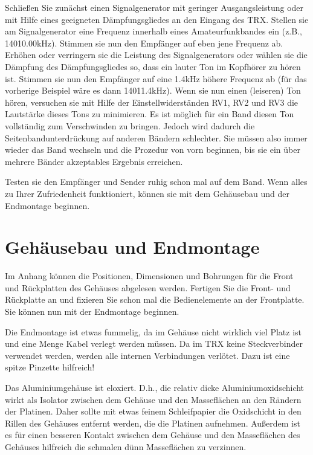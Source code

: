 \documentclass[10pt, a4paper]{paper}
\begin{document}
Schließen Sie zunächst einen Signalgenerator mit geringer Ausgangsleistung oder mit Hilfe eines geeigneten Dämpfungsgliedes an den Eingang des TRX. Stellen sie am Signalgenerator eine Frequenz innerhalb eines Amateurfunkbandes ein (z.B., 14010.00kHz). Stimmen sie nun den Empfänger auf eben jene Frequenz ab. Erhöhen oder verringern sie die Leistung des Signalgenerators oder wählen sie die Dämpfung des Dämpfungsgliedes so, dass ein lauter Ton im Kopfhörer zu hören ist. Stimmen sie nun den Empfänger auf eine 1.4kHz höhere Frequenz ab (für das vorherige Beispiel wäre es dann 14011.4kHz). Wenn sie nun einen (leiseren) Ton hören, versuchen sie mit Hilfe der Einstellwiderständen RV1, RV2 und RV3 die Lautstärke dieses Tons zu minimieren. Es ist möglich für ein Band diesen Ton vollständig zum Verschwinden zu bringen. Jedoch wird dadurch die Seitenbandunterdrückung auf anderen Bändern schlechter. Sie müssen also immer wieder das Band wechseln und die Prozedur von vorn beginnen, bis sie ein über mehrere Bänder akzeptables Ergebnis erreichen. 

Testen sie den Empfänger und Sender ruhig schon mal auf dem Band. Wenn alles zu Ihrer Zufriedenheit funktioniert, können sie mit dem Gehäusebau und der Endmontage beginnen.

\clearpage
\section{Gehäusebau und Endmontage} \label{sec:box}
Im Anhang können die Positionen, Dimensionen und Bohrungen für die Front und Rückplatten des Gehäuses abgelesen werden. Fertigen Sie die Front- und Rückplatte an und fixieren Sie schon mal die Bedienelemente an der Frontplatte. Sie können nun mit der Endmontage beginnen.

Die Endmontage ist etwas fummelig, da im Gehäuse nicht wirklich viel Platz ist und eine Menge Kabel verlegt werden müssen. Da im TRX keine Steckverbinder verwendet werden, werden alle internen Verbindungen verlötet. Dazu ist eine spitze Pinzette hilfreich!

Das Aluminiumgehäuse ist eloxiert. D.h., die relativ dicke Aluminiumoxidschicht wirkt als Isolator zwischen dem Gehäuse und den Masseflächen an den Rändern der Platinen. Daher sollte mit etwas feinem Schleifpapier die Oxidschicht in den Rillen des Gehäuses entfernt werden, die die Platinen aufnehmen. Außerdem ist es für einen besseren Kontakt zwischen dem Gehäuse und den Masseflächen des Gehäuses hilfreich die schmalen dünn Masseflächen zu verzinnen. 
\end{document}
